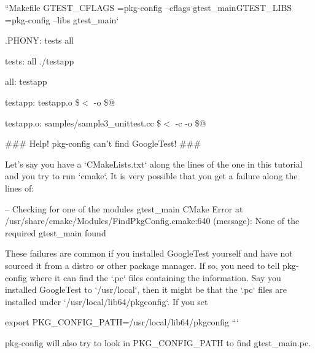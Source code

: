 ``{\ttfamily Makefile G\+T\+E\+S\+T\+\_\+\+C\+F\+L\+A\+GS =}pkg-\/config --cflags gtest\+\_\+main{\ttfamily  G\+T\+E\+S\+T\+\_\+\+L\+I\+BS =}pkg-\/config --libs gtest\+\_\+main`

.P\+H\+O\+NY\+: tests all

tests\+: all ./testapp

all\+: testapp

testapp\+: testapp.\+o    \$$<$ -\/o \$@ 

testapp.\+o\+: samples/sample3\+\_\+unittest.\+cc    \$$<$ -\/c -\/o \$@  
\begin{DoxyCode}
### Help! pkg-config can't find GoogleTest! ###

Let's say you have a `CMakeLists.txt` along the lines of the one in this
tutorial and you try to run `cmake`. It is very possible that you get a
failure along the lines of:
\end{DoxyCode}
 -- Checking for one of the modules \textquotesingle{}gtest\+\_\+main\textquotesingle{} C\+Make Error at /usr/share/cmake/\+Modules/\+Find\+Pkg\+Config.cmake\+:640 (message)\+: None of the required \textquotesingle{}gtest\+\_\+main\textquotesingle{} found 
\begin{DoxyCode}
These failures are common if you installed GoogleTest yourself and have not
sourced it from a distro or other package manager. If so, you need to tell
pkg-config where it can find the `.pc` files containing the information.
Say you installed GoogleTest to `/usr/local`, then it might be that the
`.pc` files are installed under `/usr/local/lib64/pkgconfig`. If you set
\end{DoxyCode}
 export P\+K\+G\+\_\+\+C\+O\+N\+F\+I\+G\+\_\+\+P\+A\+TH=/usr/local/lib64/pkgconfig ```

pkg-\/config will also try to look in {\ttfamily P\+K\+G\+\_\+\+C\+O\+N\+F\+I\+G\+\_\+\+P\+A\+TH} to find {\ttfamily gtest\+\_\+main.\+pc}. 